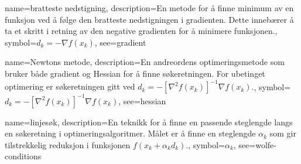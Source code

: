 {
    name=bratteste nedstigning,
    description={En metode for å finne minimum av en funksjon ved å følge den bratteste nedstigningen i gradienten. Dette innebærer å ta et skritt i retning av den negative gradienten for å minimere funksjonen.},
    symbol={\( d_k = -\nabla f(x_k) \)},
    see={gradient}
}

{
    name=Newtons metode,
    description={En andreordens optimeringsmetode som bruker både gradient og Hessian for å finne søkeretningen. For ubetinget optimering er søkeretningen gitt ved \( d_k = -[\nabla^2 f(x_k)]^{-1} \nabla f(x_k) \).},
    symbol={\( d_k = -[\nabla^2 f(x_k)]^{-1} \nabla f(x_k) \)},
    see={hessian}
}

{
    name=linjesøk,
    description={En teknikk for å finne en passende steglengde langs en søkeretning i optimeringsalgoritmer. Målet er å finne en steglengde \( \alpha_k \) som gir tilstrekkelig reduksjon i funksjonen \( f(x_k + \alpha_k d_k) \).},
    symbol={\( \alpha_k \)},
    see={wolfe-conditions}
}

